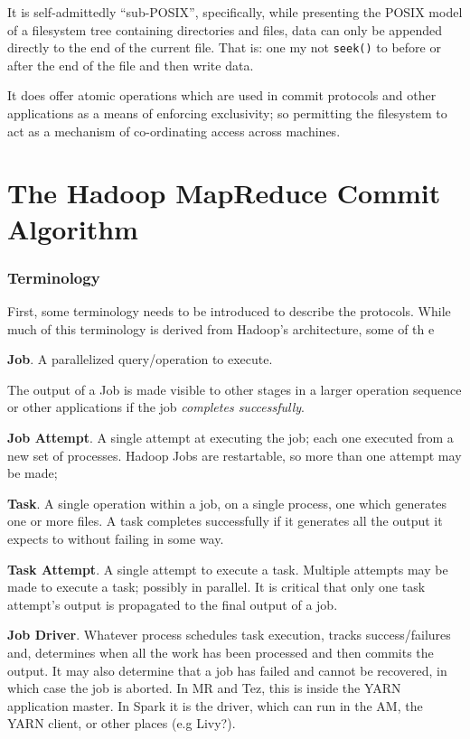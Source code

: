 \documentclass[conference]{IEEEtran}
\begin{document}
It is self-admittedly ``sub-POSIX'', specifically, while presenting the POSIX
model of a filesystem tree containing directories and files, data can only be
appended directly to the end of the current file.
That is: one my not \texttt{seek()} to before or after the end of the file and
then write data.

It does offer atomic operations which are used in commit protocols and other
applications as a means of enforcing exclusivity;
so permitting the filesystem to act as a mechanism of co-ordinating access across machines.


\section{The Hadoop MapReduce Commit Algorithm}
\label{sec:commit}


\subsubsection{Terminology}

First, some terminology needs to be introduced to describe
the protocols.
While much of this terminology is derived from Hadoop's architecture,
some of th e


\textbf{Job}.
A parallelized query/operation to execute.

The output of a Job is made visible to other stages in a larger operation
sequence or other applications if the job \emph{completes successfully}.

\textbf{Job Attempt}.
A single attempt at executing the job;
each one executed from a new set of processes.
Hadoop Jobs are restartable, so more than one attempt may be made;

\textbf{Task}.
A single operation within a job, on a single process, one which generates
one or more files.
A task completes successfully if it generates all the output it expects to without
failing in some way.

\textbf{Task Attempt}.
A single attempt to execute a task.
Multiple attempts may be made to execute a task;
possibly in parallel.
It is critical that only one task attempt's output is propagated
to the final output of a job.


\textbf{Job Driver}.
Whatever process schedules
task execution, tracks success/failures and, determines when all the work has been
processed and then commits the output.
It may also determine that a job
has failed and cannot be recovered, in which case the job is aborted.
In MR and Tez, this is inside the YARN application master.
In Spark it is the driver, which can run in the AM, the YARN client, or other
places (e.g Livy?).
\end{document}

